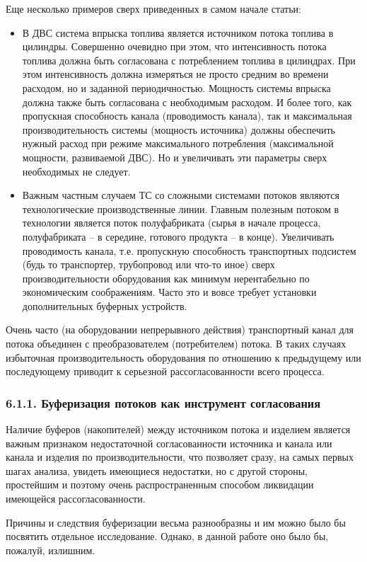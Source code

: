 \documentclass[a4paper,11pt]{article}
\begin{document}
Еще несколько примеров сверх приведенных в самом начале статьи:
\begin{itemize}
\item В ДВС система впрыска топлива является источником потока топлива в
  цилиндры. Совершенно очевидно при этом, что интенсивность потока топлива
  должна быть согласована с потреблением топлива в цилиндрах. При этом
  интенсивность должна измеряться не просто средним во времени расходом, но и
  заданной периодичностью. Мощность системы впрыска должна также быть
  согласована с необходимым расходом. И более того, как пропускная способность
  канала (проводимость канала), так и максимальная производительность системы
  (мощность источника) должны обеспечить нужный расход при режиме
  максимального потребления (максимальной мощности, развиваемой ДВС). Но и
  увеличивать эти параметры сверх необходимых не следует.
\item Важным частным случаем ТС со сложными системами потоков являются
  технологические производственные линии. Главным полезным потоком в
  технологии является поток полуфабриката (сырья в начале процесса,
  полуфабриката -- в середине, готового продукта -- в конце). Увеличивать
  проводимость канала, т.е. пропускную способность транспортных подсистем
  (будь то транспортер, трубопровод или что-то иное) сверх производительности
  оборудования как минимум нерентабельно по экономическим соображениям. Часто
  это и вовсе требует установки дополнительных буферных устройств.
\end{itemize}
Очень часто (на оборудовании непрерывного действия) транспортный канал для
потока объединен с преобразователем (потребителем) потока. В таких случаях
избыточная производительность оборудования по отношению к предыдущему или
последующему приводит к серьезной рассогласованности всего процесса.

\subsubsection{6.1.1.  Буферизация потоков как инструмент согласования}

Наличие буферов (накопителей) между источником потока и изделием является
важным признаком недостаточной согласованности источника и канала или канала и
изделия по производительности, что позволяет сразу, на самых первых шагах
анализа, увидеть имеющиеся недостатки, но с другой стороны, простейшим и
поэтому очень распространенным способом ликвидации имеющейся
рассогласованности.

Причины и следствия буферизации весьма разнообразны и им можно было бы
посвятить отдельное исследование. Однако, в данной работе оно было бы,
пожалуй, излишним.
\end{document}
